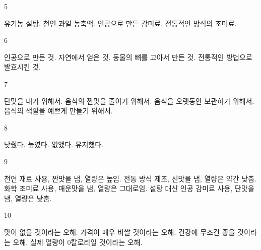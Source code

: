 \documentclass[fs9,seriesFre]{korfarm-base}
\begin{document}
\begin{kfSentenceUnit}{5}{}
\begin{kfChoices}
\kfChoice 유기농 설탕.
\kfChoice 천연 과일 농축액.
\kfChoice 인공으로 만든 감미료.
\kfChoice 전통적인 방식의 조미료.
\end{kfChoices}
\end{kfSentenceUnit}

\begin{kfSentenceUnit}{6}{}
\begin{kfChoices}
\kfChoice 인공으로 만든 것.
\kfChoice 자연에서 얻은 것.
\kfChoice 동물의 뼈를 고아서 만든 것.
\kfChoice 전통적인 방법으로 발효시킨 것.
\end{kfChoices}
\end{kfSentenceUnit}

\begin{kfSentenceUnit}{7}{}
\begin{kfChoices}
\kfChoice 단맛을 내기 위해서.
\kfChoice 음식의 짠맛을 줄이기 위해서.
\kfChoice 음식을 오랫동안 보관하기 위해서.
\kfChoice 음식의 색깔을 예쁘게 만들기 위해서.
\end{kfChoices}
\end{kfSentenceUnit}

\begin{kfSentenceUnit}{8}{}
\begin{kfChoices}
\kfChoice 낮췄다.
\kfChoice 높였다.
\kfChoice 없앴다.
\kfChoice 유지했다.
\end{kfChoices}
\end{kfSentenceUnit}

\begin{kfSentenceUnit}{9}{}
\begin{kfChoices}
\kfChoice 천연 재료 사용, 짠맛을 냄, 열량은 높임.
\kfChoice 전통 방식 제조, 신맛을 냄, 열량은 약간 낮춤.
\kfChoice 화학 조미료 사용, 매운맛을 냄, 열량은 그대로임.
\kfChoice 설탕 대신 인공 감미료 사용, 단맛을 냄, 열량은 낮춤.
\end{kfChoices}
\end{kfSentenceUnit}

\begin{kfSentenceUnit}{10}{}
\begin{kfChoices}
\kfChoice 맛이 없을 것이라는 오해.
\kfChoice 가격이 매우 비쌀 것이라는 오해.
\kfChoice 건강에 무조건 좋을 것이라는 오해.
\kfChoice 실제 열량이 0칼로리일 것이라는 오해.
\end{kfChoices}
\end{kfSentenceUnit}
\end{document}
